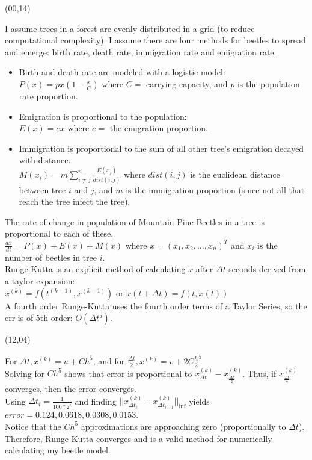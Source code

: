 \documentclass{article}
\def\CHead#1{\begin{center}\noindent{\LARGE\color{DarkBlue} #1}\end{center}}
\renewcommand{\LARGE}{\fontsize{43}{54}\selectfont}
\begin{document}
\begin{textblock}{10}(00,14)
\CHead{Mathematics}
I assume trees in a forest are evenly distributed in a grid (to reduce computational complexity). I assume there are four methods for beetles to spread and emerge: birth rate, death rate, immigration rate and emigration rate.
\begin{itemize}
\item Birth and death rate are modeled with a logistic model:\\
$P(x) = px(1-\frac{x}{C})$ where $C =$ carrying capacity, and $p$ is the population rate proportion.
\item Emigration is proportional to the population:\\
$E(x) = ex$ where $e =$ the emigration proportion.
\item Immigration is proportional to the sum of all other tree's emigration decayed with distance.\\
$M(x_i) = m\sum_{i \neq j}^{n}\frac{E(x_j)}{dist(i, j)}$ where $dist(i, j)$ is the euclidean distance between tree $i$ and $j$, and $m$ is the immigration proportion (since not all that reach the tree infect the tree).
\end{itemize}
The rate of change in population of Mountain Pine Beetles in a tree is proportional to each of these.\\
$\frac{dx}{dt} = P(x) + E(x) + M(x)$ where $x = (x_1, x_2, ..., x_n)^T$ and $x_i$ is the number of beetles in tree $i$.\\
Runge-Kutta is an explicit method of calculating $x$ after $\Delta t$ seconds derived from a taylor expansion:\\
$x^{(k)} = f(t^{(k-1)}, x^{(k-1)})$ or $x(t+\Delta t) = f(t, x(t))$\\
A fourth order Runge-Kutta uses the fourth order terms of a Taylor Series, so the err is of 5th order: $O(\Delta t^5)$.
\end{textblock}



\begin{textblock}{10}(12,04)
\CHead{Evaluation of Solution}
For $\Delta t, x^{(k)} = u + Ch^5$, and
for $\frac{\Delta t}{2}, x^{(k)} = v + 2C\frac{h}{2}^5$\\
Solving for $Ch^5$ shows that error is proportional to $x_{\Delta t}^{(k)}-x_{\frac{\Delta t}{2}}^{(k)}$. Thus, if $x_{\frac{\Delta t}{n}}^{(k)}$ converges, then the error converges.\\
Using $\Delta t_i = \frac{1}{100*2^i}$ and finding $||x_{\Delta t_i}^{(k)}-x_{\Delta t_{i-1}}^{(k)}||_{\inf}$ yields\\
$error = 0.124, 0.0618, 0.0308, 0.0153$.\\
Notice that the $Ch^5$ approximations are approaching zero (proportionally to $\Delta t$). Therefore, Runge-Kutta converges and is a valid method for numerically calculating my beetle model.
\end{textblock}
\end{document}
